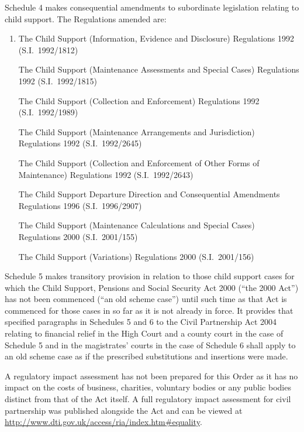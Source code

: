 \documentclass[12pt,a4paper]{article}
\begin{document}
Schedule 4 makes consequential amendments to subordinate legislation relating to child support. The Regulations amended are:
\begin{enumerate}\item[]
    The Child Support (Information, Evidence and Disclosure) Regulations 1992 (S.I.\ 1992/1812)

    The Child Support (Maintenance Assessments and Special Cases) Regulations 1992 (S.I.\ 1992/1815)

    The Child Support (Collection and Enforcement) Regulations 1992 (S.I.\ 1992/1989)

    The Child Support (Maintenance Arrangements and Jurisdiction) Regulations 1992 (S.I.\ 1992/2645)

    The Child Support (Collection and Enforcement of Other Forms of Maintenance) Regulations 1992 (S.I.\ 1992/2643)

    The Child Support Departure Direction and Consequential Amendments Regulations 1996 (S.I.\ 1996/2907)

    The Child Support (Maintenance Calculations and Special Cases) Regulations 2000 (S.I.\ 2001/155)

    The Child Support (Variations) Regulations 2000 (S.I.\ 2001/156) 
\end{enumerate}

Schedule 5 makes transitory provision in relation to those child support cases for which the Child Support, Pensions and Social Security Act 2000 (“the 2000 Act”) has not been commenced (“an old scheme case”) until such time as that Act is commenced for those cases in so far as it is not already in force. It provides that specified paragraphs in Schedules 5 and 6 to the Civil Partnership Act 2004 relating to financial relief in the High Court and a county court in the case of Schedule 5 and in the magistrates' courts in the case of Schedule 6 shall apply to an old scheme case as if the prescribed substitutions and insertions were made.

A regulatory impact assessment has not been prepared for this Order as it has no impact on the costs of business, charities, voluntary bodies or any public bodies distinct from that of the Act itself. A full regulatory impact assessment for civil partnership was published alongside the Act and can be viewed at \url{http://www.dti.gov.uk/access/ria/index.htm#equality}. 
\end{document}
